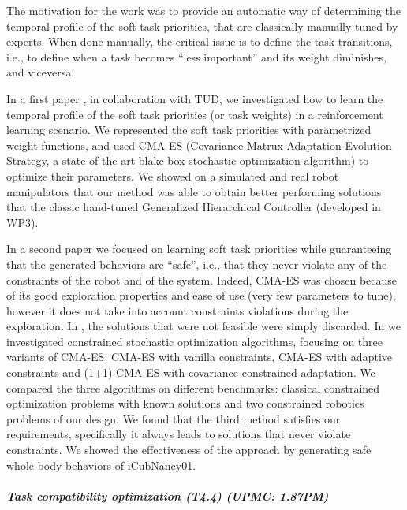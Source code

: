 The motivation for the work was to provide an automatic way of determining the temporal profile of the soft task priorities, that are classically manually tuned by experts. When done manually, the critical issue is to define the task transitions, i.e., to define when a task becomes ``less important'' and its weight diminishes, and viceversa.

In a first paper \cite{Modugno_PICRA_2016}, in collaboration with TUD, we investigated how to learn the temporal profile of the soft task priorities (or task weights) in a reinforcement learning scenario. We represented the soft task priorities with parametrized weight functions, and used CMA-ES (Covariance Matrux Adaptation Evolution Strategy, a state-of-the-art blakc-box stochastic optimization algorithm) to optimize their parameters. We showed on a simulated and real robot manipulators that our method was able to obtain better performing solutions that the classic hand-tuned Generalized Hierarchical Controller (developed in WP3).

In a second paper \cite{modugno2016learning} we focused on learning soft task priorities while guaranteeing that the generated behaviors are ``safe'', i.e., that they never violate any of the constraints of the robot and of the system. Indeed, CMA-ES was chosen because of its good exploration properties and ease of use (very few parameters to tune), however it does not take into account constraints violations during the exploration. In \cite{Modugno_PICRA_2016}, the solutions that were not feasible were simply discarded. In \cite{modugno2016learning} we investigated constrained stochastic optimization algorithms, focusing on three variants of CMA-ES: CMA-ES with vanilla constraints, CMA-ES with adaptive constraints and (1+1)-CMA-ES with covariance constrained adaptation. We compared the three algorithms on different benchmarks: classical constrained optimization problems with known solutions and two constrained robotics problems of our design. We found that the third method satisfies our requirements, specifically it always leads to solutions that never violate constraints. We showed the effectiveness of the approach by generating safe whole-body behaviors of iCubNancy01.

\subparagraph{Task compatibility optimization (T4.4) (UPMC: 1.87PM)}

